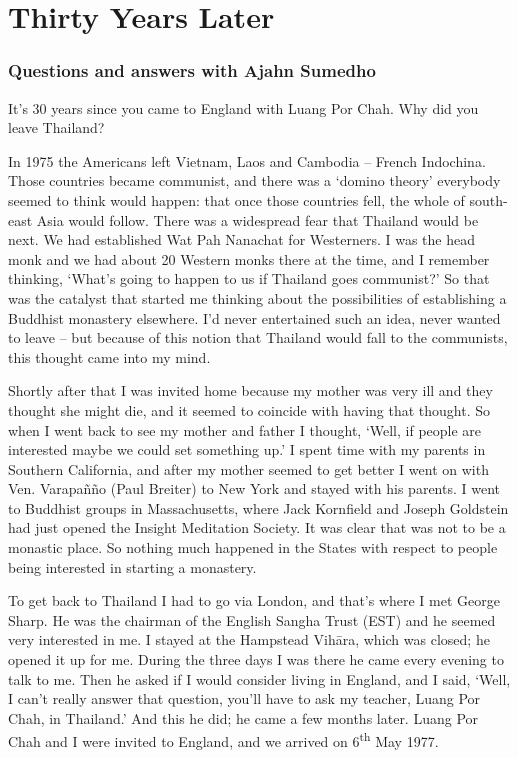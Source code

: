 
\chapter{Thirty Years Later}

\subsection{Questions and answers with Ajahn Sumedho}

\question{}
It's 30 years since you came to England with Luang Por Chah. Why did
you leave Thailand?

\answer{}
In 1975 the Americans left Vietnam, Laos and Cambodia --
French Indochina. Those countries became communist, and there was a
`domino theory' everybody seemed to think would happen: that once those
countries fell, the whole of south-east Asia would follow. There was a
widespread fear that Thailand would be next. We had established Wat Pah
Nanachat for Westerners. I was the head monk and we had about 20
Western monks there at the time, and I remember thinking, `What's going
to happen to us if Thailand goes communist?' So that was the catalyst
that started me thinking about the possibilities of establishing a
Buddhist monastery elsewhere. I'd never entertained such an idea, never
wanted to leave -- but because of this notion that Thailand would fall
to the communists, this thought came into my mind. 

Shortly after that I was invited home because my mother was very ill and
they thought she might die, and it seemed to coincide with having that
thought. So when I went back to see my mother and father I thought, 
`Well, if people are interested maybe we could set something up.' I
spent time with my parents in Southern California, and after my mother
seemed to get better I went on with Ven. Varapañño (Paul Breiter) to New
York and stayed with his parents. I went to Buddhist groups in
Massachusetts, where Jack Kornfield and Joseph Goldstein had just opened
the Insight Meditation Society. It was clear that was not to be a
monastic place. So nothing much happened in the States with respect to
people being interested in starting a monastery. 

To get back to Thailand I had to go via London, and that's where I met
George Sharp. He was the chairman of the English Sangha Trust (EST) and
he seemed very interested in me. I stayed at the Hampstead Vihāra, which
was closed; he opened it up for me. During the three days I was there he
came every evening to talk to me. Then he asked if I would consider
living in England, and I said, `Well, I can't really answer that
question, you'll have to ask my teacher, Luang Por Chah, in Thailand.'
And this he did; he came a few months later. Luang Por Chah and I were
invited to England, and we arrived on 6\textsuperscript{th} May 1977.

